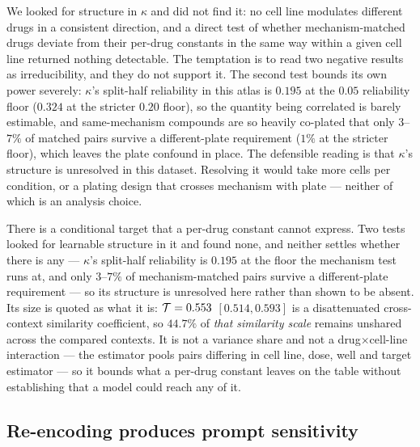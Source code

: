 We looked for structure in $\kappa$ and did not find it: no cell line modulates different drugs in
a consistent direction, and a direct test of whether mechanism-matched drugs deviate from their
per-drug constants in the same way within a given cell line returned nothing detectable.
 The temptation is to read two negative results as irreducibility, and they do not
support it. The second test bounds its own power severely: $\kappa$'s split-half reliability in this
atlas is $0.195$ at the $0.05$ reliability floor ($0.324$ at the stricter $0.20$ floor), so the
quantity being correlated is barely estimable, and same-mechanism compounds are so heavily co-plated
that only $3$--$7\%$ of matched pairs survive a different-plate requirement ($1\%$ at the stricter
floor), which leaves the plate confound in place. The defensible reading is that $\kappa$'s
structure is unresolved in this dataset. Resolving it would take more cells per condition, or a
plating design that crosses mechanism with plate --- neither of which is an analysis choice.

\begin{claim}
There is a conditional target that a per-drug constant cannot express. Two tests looked for learnable
structure in it and found none, and neither settles whether there is any --- $\kappa$'s split-half
reliability is $0.195$ at the floor the mechanism test runs at, and only $3$--$7\%$ of
mechanism-matched pairs survive a different-plate requirement --- so its structure is unresolved here
rather than shown to be absent. Its size is quoted as what it is: $\mathcal{T} = 0.553$ \nolinebreak[3]$[0.514, 0.593]$ is a
disattenuated cross-context similarity coefficient, so $44.7\%$ of \emph{that similarity scale}
remains unshared across the compared contexts. It is not a variance share and not a
drug$\times$cell-line interaction --- the estimator pools pairs differing in cell line, dose, well
and target estimator --- so it bounds what a per-drug constant leaves on the table without
establishing that a model could reach any of it.
\end{claim}

\subsection{Re-encoding produces prompt sensitivity}
\label{sec:res-encoding}

